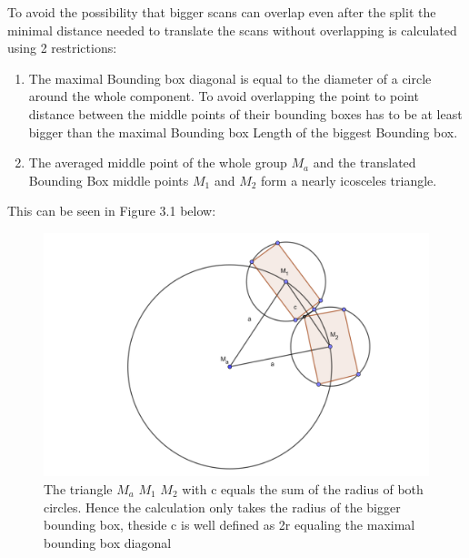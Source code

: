 \documentclass[hyperref,english,bachelorofscience,bibnum]{cgvpub}
\begin{document}

To avoid the possibility that bigger scans can overlap even after the split the minimal distance needed to translate the scans without overlapping is calculated using 2 restrictions:
\begin{enumerate}
\item The maximal Bounding box diagonal is equal to the diameter of a circle around the whole component. To avoid overlapping the point to point distance between the middle points of their bounding boxes has to be at least bigger than the maximal Bounding box Length of the biggest Bounding box.
\item The averaged middle point of the whole group $M_a$ and the translated Bounding Box middle points $M_1$ and $M_2$ form a nearly icosceles triangle.
\end{enumerate}
This can be seen in Figure 3.1 below: 

\begin{figure}[htbp]
	\centering
		\includegraphics[width= \linewidth]{ico_pic.png}
	\caption{The triangle $M_a$ $M_1$ $M_2$ with c equals the sum of the radius of both circles. Hence the calculation only takes the radius of the bigger bounding box, theside c is well defined as 2r equaling the maximal bounding box diagonal}
	\label{fig:ico}
\end{figure}
\end{document}
